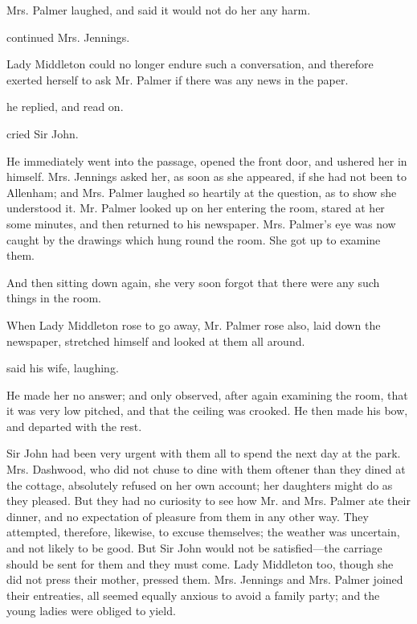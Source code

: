 Mrs. Palmer laughed, and said it would not do her any harm.

 continued Mrs. Jennings.

Lady Middleton could no longer endure such a conversation, and therefore exerted herself to ask Mr. Palmer if there was any news in the paper.

 he replied, and read on.

 cried Sir John. 

He immediately went into the passage, opened the front door, and ushered her in himself. Mrs. Jennings asked her, as soon as she appeared, if she had not been to Allenham; and Mrs. Palmer laughed so heartily at the question, as to show she understood it. Mr. Palmer looked up on her entering the room, stared at her some minutes, and then returned to his newspaper. Mrs. Palmer's eye was now caught by the drawings which hung round the room. She got up to examine them.

 And then sitting down again, she very soon forgot that there were any such things in the room.

When Lady Middleton rose to go away, Mr. Palmer rose also, laid down the newspaper, stretched himself and looked at them all around.

 said his wife, laughing.

He made her no answer; and only observed, after again examining the room, that it was very low pitched, and that the ceiling was crooked. He then made his bow, and departed with the rest.

Sir John had been very urgent with them all to spend the next day at the park. Mrs. Dashwood, who did not chuse to dine with them oftener than they dined at the cottage, absolutely refused on her own account; her daughters might do as they pleased. But they had no curiosity to see how Mr. and Mrs. Palmer ate their dinner, and no expectation of pleasure from them in any other way. They attempted, therefore, likewise, to excuse themselves; the weather was uncertain, and not likely to be good. But Sir John would not be satisfied---the carriage should be sent for them and they must come. Lady Middleton too, though she did not press their mother, pressed them. Mrs. Jennings and Mrs. Palmer joined their entreaties, all seemed equally anxious to avoid a family party; and the young ladies were obliged to yield.

